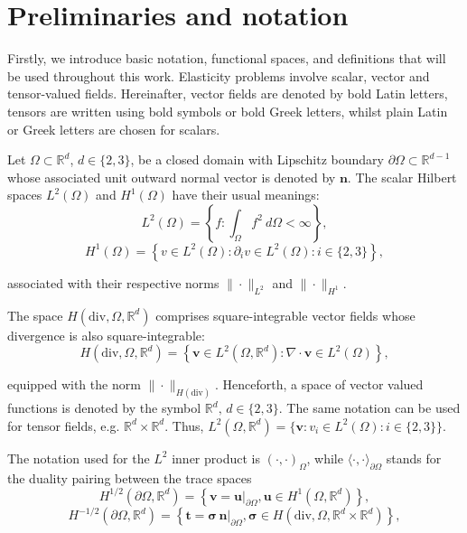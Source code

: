 \documentclass[english,11pt,3p,number,sort&compress]{elsarticle}
\newcommand{\giovane}{\color{red}{\bf\Large GA} \color{cyan} }
\begin{document}
\section{Preliminaries and notation}

Firstly, we introduce basic notation, functional spaces, and definitions that will be used throughout this work. Elasticity problems involve scalar, vector and tensor-valued fields. Hereinafter, vector fields are denoted by bold Latin letters, tensors are written using bold symbols or bold Greek letters, whilst plain Latin or Greek letters are chosen for scalars.

Let $\Omega \subset \mathbb{R}^d$, $d \in \{2, 3\}$, be a closed domain with Lipschitz boundary $\partial \Omega \subset \mathbb{R}^{d-1}$ whose  associated unit outward normal vector is denoted by $\bm{n}$. The scalar Hilbert spaces $L^2(\Omega)$ and $H^1(\Omega)$ have their usual meanings:
\begin{equation*}
    L^2(\Omega) = \left\{f: \int_{\Omega} f^2  ~d \Omega < \infty \right\},
\end{equation*}
\begin{equation*}
    H^1(\Omega) = \left\{v \in L^2(\Omega) : \partial_i v \in L^2 
    (\Omega) : i \in\{2,3\} \right\},
\end{equation*}

\noindent associated with their respective norms $\| \cdot \|_{L^2}$ and $\| \cdot \|_{H^1}$.

The space $H(\text{div},\Omega,\mathbb{R}^d)$ comprises square-integrable vector fields whose divergence is also square-integrable:
\begin{equation*}
	H(\text{div},\Omega,\mathbb{R}^d) = \left\{\bm{v} \in L^2(\Omega,\mathbb{R}^d) : \nabla \cdot \bm{v} \in L^2(\Omega) \right\},
\end{equation*}

\noindent equipped with the norm $\| \cdot \|_{H(\text{div})}$. {\giovane Henceforth, a space of vector valued functions is denoted by the symbol $\mathbb{R}^d, \,d \in \{2,3\}$. The same notation can be used for tensor fields, e.g. $\mathbb{R}^d \times \mathbb{R}^d$. Thus, \(L^2(\Omega,\mathbb{R}^d)=\{\bm{v} : v_i \in L^2(\Omega) : i \in\{2,3\} \}\).}

The notation used for the $L^2$ inner product is $(\cdot,\cdot)_{\Omega}$, while $\langle \cdot,\cdot\rangle_{\partial\Omega}$ stands for the duality pairing between the trace spaces
\begin{equation*}
	H^{1/2}(\partial\Omega,\mathbb{R}^d) = \left\{\bm{v}=\bm{u} \lvert_{\partial\Omega}, \bm{u} \in H^1(\Omega,\mathbb{R}^d)\right\},
\end{equation*}
\begin{equation*}
	H^{-1/2}(\partial\Omega,\mathbb{R}^d) = \left\{\bm{t}=\bm{\sigma} \,\bm{n} \lvert_{\partial\Omega}, \bm{\sigma} \in H(\text{div},\Omega,\mathbb{R}^d \times \mathbb{R}^d) \right\},
\end{equation*}
\end{document}
